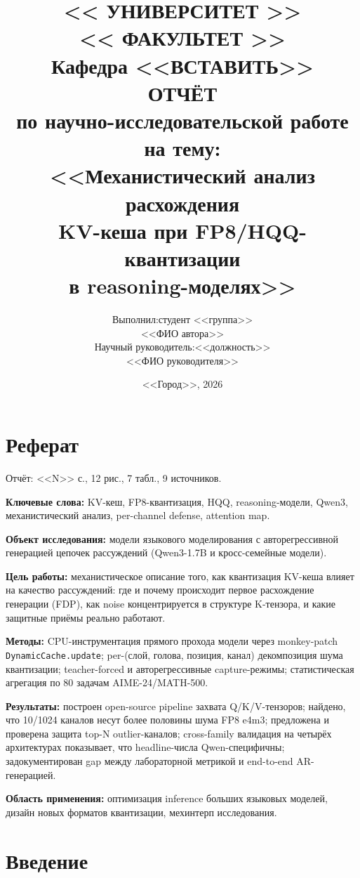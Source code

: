 \documentclass[a4paper,12pt]{article}
\title{
  \vspace{-1cm}
  \large{<< УНИВЕРСИТЕТ >>} \\
  \large{<< ФАКУЛЬТЕТ >>} \\
  \large{Кафедра <<ВСТАВИТЬ>>}\\[3cm]
  \LARGE{\textbf{ОТЧЁТ}}\\
  \large{по научно-исследовательской работе}\\[1cm]
  \large{на тему:}\\[0.5cm]
  \LARGE{<<Механистический анализ расхождения\\
  KV-кеша при FP8/HQQ-квантизации\\
  в reasoning-моделях>>}
}
\author{
  \begin{flushright}
  \begin{tabular}{rl}
  Выполнил: & студент <<группа>> \\
            & <<ФИО автора>> \\
  Научный руководитель: & <<должность>> \\
                        & <<ФИО руководителя>>\\
  \end{tabular}
  \end{flushright}
}
\date{
  \vspace{3cm}
  \large{<<Город>>, 2026}
}
\begin{document}
\maketitle
\thispagestyle{empty}
\newpage

\section*{Реферат}

Отчёт: <<N>> с., 12 рис., 7 табл., 9 источников.

\textbf{Ключевые слова:} KV-кеш, FP8-квантизация, HQQ, reasoning-модели, Qwen3, механистический анализ, per-channel defense, attention map.

\textbf{Объект исследования:} модели языкового моделирования с авторегрессивной генерацией цепочек рассуждений (Qwen3-1.7B и кросс-семейные модели).

\textbf{Цель работы:} механистическое описание того, как квантизация KV-кеша влияет на качество рассуждений: где и почему происходит первое расхождение генерации (FDP), как noise концентрируется в структуре K-тензора, и какие защитные приёмы реально работают.

\textbf{Методы:} CPU-инструментация прямого прохода модели через monkey-patch \texttt{DynamicCache.update}; per-(слой, голова, позиция, канал) декомпозиция шума квантизации; teacher-forced и авторегрессивные capture-режимы; статистическая агрегация по 80 задачам AIME-24/MATH-500.

\textbf{Результаты:} построен open-source pipeline захвата Q/K/V-тензоров; найдено, что 10/1024 каналов несут более половины шума FP8 e4m3; предложена и проверена защита top-N outlier-каналов; cross-family валидация на четырёх архитектурах показывает, что headline-числа Qwen-специфичны; задокументирован gap между лабораторной метрикой и end-to-end AR-генерацией.

\textbf{Область применения:} оптимизация inference больших языковых моделей, дизайн новых форматов квантизации, мехинтерп исследования.

\newpage

\tableofcontents
\newpage

\section{Введение}
\end{document}
